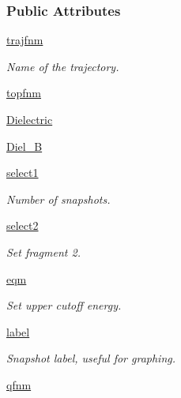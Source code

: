 \subsubsection*{Public Attributes}
\begin{DoxyCompactItemize}
\item 
\hyperlink{classforcebalance_1_1gmxio_1_1Interaction__GMX_a6509ba9c6cb4618812e493c2715a64f3}{trajfnm}
\begin{DoxyCompactList}\small\item\em Name of the trajectory. \end{DoxyCompactList}\item 
\hyperlink{classforcebalance_1_1gmxio_1_1Interaction__GMX_a8d43d5b83c331a64f7c97253ce64a9c8}{topfnm}
\item 
\hyperlink{classforcebalance_1_1gmxio_1_1Interaction__GMX_af61ae542d6d62f7fa88256e1fe838815}{Dielectric}
\item 
\hyperlink{classforcebalance_1_1gmxio_1_1Interaction__GMX_a8a253cb432123a346b8a51f96fae20be}{Diel\-\_\-\-B}
\item 
\hyperlink{classforcebalance_1_1interaction_1_1Interaction_a22c4a698eb3bf91187894fdce874e8d5}{select1}
\begin{DoxyCompactList}\small\item\em Number of snapshots. \end{DoxyCompactList}\item 
\hyperlink{classforcebalance_1_1interaction_1_1Interaction_acbdfffa2596af6c90adf0bfe071d2205}{select2}
\begin{DoxyCompactList}\small\item\em Set fragment 2. \end{DoxyCompactList}\item 
\hyperlink{classforcebalance_1_1interaction_1_1Interaction_a4e609a6bd7e9a0852622ecc4ca5537d1}{eqm}
\begin{DoxyCompactList}\small\item\em Set upper cutoff energy. \end{DoxyCompactList}\item 
\hyperlink{classforcebalance_1_1interaction_1_1Interaction_a35a5c40d99a474bbf6032888f1f75e46}{label}
\begin{DoxyCompactList}\small\item\em Snapshot label, useful for graphing. \end{DoxyCompactList}\item 
\hyperlink{classforcebalance_1_1interaction_1_1Interaction_a6b49404cbea9c353fc4b97506ff143c6}{qfnm}

\end{DoxyCompactItemize}

